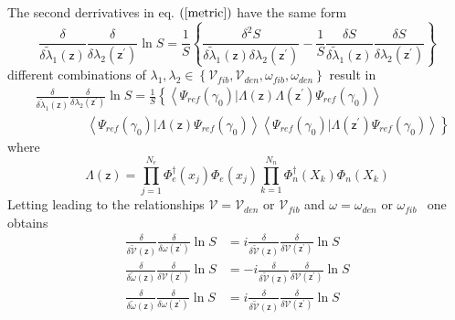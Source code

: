 \documentclass[aps,preprint]{revtex4}%
\begin{document}
The second derrivatives in eq. $\left(  \ref{metric}\right)  $ have the same
form
\begin{equation}
\frac{\delta}{\delta\tilde{\lambda}_{1}(\mathsf{z})}\frac{\delta}%
{\delta\lambda_{2}(\mathsf{z}^{\prime})}\ln S=\frac{1}{S}\left\{  \frac
{\delta^{2}S}{\delta\tilde{\lambda}_{1}(\mathsf{z})\delta\lambda
_{2}(\mathsf{z}^{\prime})}-\frac{1}{S}\frac{\delta S}{\delta\tilde{\lambda
}_{1}(\mathsf{z})}\frac{\delta S}{\delta\lambda_{2}(\mathsf{z}^{\prime}%
)}\right\}
\end{equation}
different combinations of $\lambda_{1},\lambda_{2}\in\left\{  \mathcal{V}%
_{fib},\mathcal{V}_{den},\omega_{fib},\omega_{den}\right\}  $ result in
\begin{align}
&  \frac{\delta}{\delta\tilde{\lambda}_{1}(\mathsf{z})}\frac{\delta}%
{\delta\lambda_{2}(\mathsf{z}^{\prime})}\ln S=\frac{1}{S}\left\{  \left\langle
\Psi_{ref}\left(  \gamma_{0}\right)  |\Lambda\left(  \mathsf{z}\right)
\Lambda\left(  \mathsf{z}^{\prime}\right)  \Psi_{ref}\left(  \gamma
_{0}\right)  \right\rangle \right. \nonumber\\
&  \qquad\qquad\left.  \left\langle \Psi_{ref}\left(  \gamma_{0}\right)
|\Lambda\left(  \mathsf{z}\right)  \Psi_{ref}\left(  \gamma_{0}\right)
\right\rangle \left\langle \Psi_{ref}\left(  \gamma_{0}\right)  |\Lambda
\left(  \mathsf{z}^{\prime}\right)  \Psi_{ref}\left(  \gamma_{0}\right)
\right\rangle \right\}
\end{align}
where%
\begin{equation}
\Lambda\left(  \mathsf{z}\right)  =\prod\limits_{j=1}^{N_{e}}\Phi_{e}%
^{\dagger}(x_{j})\Phi_{e}(x_{j})\prod\limits_{k=1}^{N_{n}}\Phi_{n}^{\dagger
}(X_{k})\Phi_{n}(X_{k})
\end{equation}
Letting leading to the relationships $\mathcal{V=V}_{den}$ or $\mathcal{V}%
_{fib}$ and $\omega=\omega_{den}$ or $\omega_{fib\text{ }}$ one obtains
\begin{align}
\frac{\delta}{\delta\mathcal{\tilde{V}}(\mathsf{z})}\frac{\delta}{\delta
\omega(\mathsf{z}^{\prime})}\ln S  &  =i\frac{\delta}{\delta\mathcal{\tilde
{V}}(\mathsf{z})}\frac{\delta}{\delta\mathcal{V}(\mathsf{z}^{\prime})}\ln S\\
\frac{\delta}{\delta\mathcal{\tilde{\omega}}(\mathsf{z})}\frac{\delta}%
{\delta\mathcal{V}(\mathsf{z}^{\prime})}\ln S  &  =-i\frac{\delta}%
{\delta\mathcal{\tilde{V}}(\mathsf{z})}\frac{\delta}{\delta\mathcal{V}%
(\mathsf{z}^{\prime})}\ln S\\
\frac{\delta}{\delta\mathcal{\tilde{\omega}}(\mathsf{z})}\frac{\delta}%
{\delta\omega(\mathsf{z}^{\prime})}\ln S  &  =i\frac{\delta}{\delta
\mathcal{\tilde{V}}(\mathsf{z})}\frac{\delta}{\delta\mathcal{V}(\mathsf{z}%
^{\prime})}\ln S
\end{align}
\end{document}
